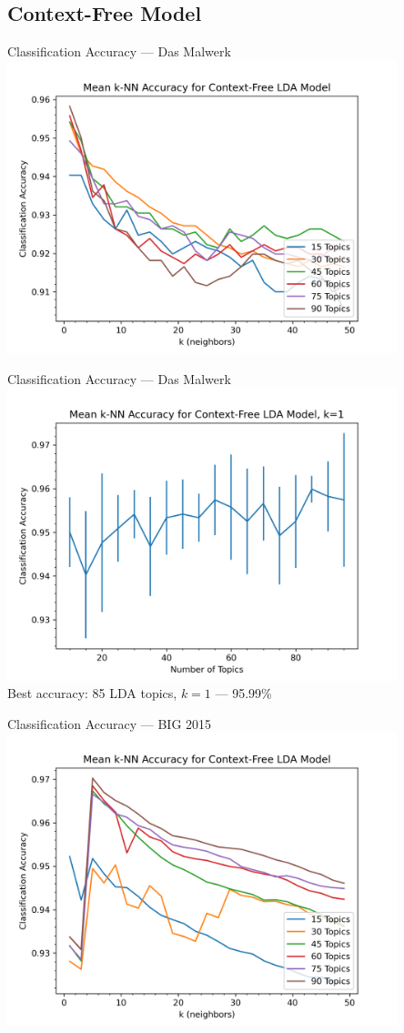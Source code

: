 \documentclass[handout,11pt]{beamer}
\begin{document}
	\subsection{Context-Free Model}
	\begin{frame}{Classification Accuracy --- Das Malwerk}
		\centering
		\includegraphics[width=0.85\textwidth]{img/win32/knn_lda.png}
	\end{frame}
	\begin{frame}{Classification Accuracy --- Das Malwerk}
		\centering
		\includegraphics[width=0.85\textwidth]{img/win32/knn_lda_k_01.png} \\
		Best accuracy: 85 LDA topics, $k=1$ --- 95.99\%
	\end{frame}
	\begin{frame}{Classification Accuracy --- BIG 2015}
		\centering
		\includegraphics[width=0.85\textwidth]{img/msoft_big/knn_lda.png}
	\end{frame}
\end{document}
